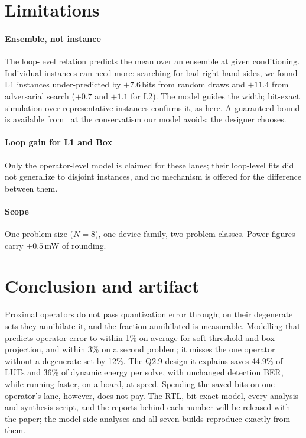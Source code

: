 \documentclass[conference]{IEEEtran}
\begin{document}
\section{Limitations}
\label{sec:limits}

\paragraph{Ensemble, not instance} The loop-level relation predicts the mean
over an ensemble at given conditioning. Individual instances can need more:
searching for bad right-hand sides, we found L1 instances under-predicted by
$+7.6$\,bits from random draws and $+11.4$ from adversarial search ($+0.7$ and
$+1.1$ for L2). The model guides the width; bit-exact simulation over
representative instances confirms it, as here. A guaranteed bound is
available from~\cite{jerez2014mpc,kinsman2011iterative} at the conservatism
our model avoids; the designer chooses.

\paragraph{Loop gain for L1 and Box} Only the operator-level model is claimed
for these lanes; their loop-level fits did not generalize to disjoint instances,
and no mechanism is offered for the difference between them.

\paragraph{Scope} One problem size ($N=8$), one device family, two problem
classes. Power figures carry $\pm0.5$\,mW of rounding.

\section{Conclusion and artifact}

Proximal operators do not pass quantization error through; on their
degenerate sets they annihilate it, and the fraction annihilated is
measurable. Modelling that predicts operator error to within 1\% on average
for soft-threshold and box projection, and within 3\% on a second problem; it
misses the one operator without a degenerate set by 12\%. The Q2.9 design it
explains saves 44.9\% of LUTs and 36\% of dynamic energy per solve, with
unchanged detection BER, while running faster, on a board, at speed. Spending the saved bits on one operator's lane, however, does not pay.
The RTL, bit-exact model, every analysis and synthesis script, and the
reports behind each number will be released with the paper; the model-side
analyses and all seven builds reproduce exactly from them.



\end{document}
